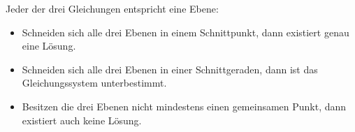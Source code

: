 Jeder der drei Gleichungen entspricht eine Ebene: 
\begin{itemize}
    \item Schneiden sich alle drei Ebenen in einem Schnittpunkt, dann existiert genau eine Lösung. 
    \item Schneiden sich alle drei Ebenen in einer Schnittgeraden, dann ist das Gleichungssystem unterbestimmt. 
    \item Besitzen die drei Ebenen nicht mindestens einen gemeinsamen Punkt, dann existiert auch keine Lösung.
\end{itemize}